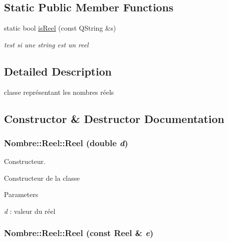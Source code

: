 \subsection*{Static Public Member Functions}
\begin{DoxyCompactItemize}
\item 
static bool \hyperlink{classNombre_1_1Reel_ae6dec0b4607388e95e1247c215fa165d}{isReel} (const QString \&s)
\begin{DoxyCompactList}\small\item\em test si une string est un reel \item\end{DoxyCompactList}\end{DoxyCompactItemize}


\subsection{Detailed Description}
classe représentant les nombres réels 

\subsection{Constructor \& Destructor Documentation}
\hypertarget{classNombre_1_1Reel_a7435c6c760397d4a481e5f8a684da18d}{
\subsubsection[{Reel}]{\setlength{\rightskip}{0pt plus 5cm}Nombre::Reel::Reel (double {\em d})}}
\label{classNombre_1_1Reel_a7435c6c760397d4a481e5f8a684da18d}


Constructeur. 

Constructeur de la classe


\begin{DoxyParams}{Parameters}
\item[{\em d}]: valeur du réel \end{DoxyParams}
\hypertarget{classNombre_1_1Reel_a4343cb0e3dc44c60a4a6239da218b196}{
\subsubsection[{Reel}]{\setlength{\rightskip}{0pt plus 5cm}Nombre::Reel::Reel (const {\bf Reel} \& {\em e})}}
\label{classNombre_1_1Reel_a4343cb0e3dc44c60a4a6239da218b196}


